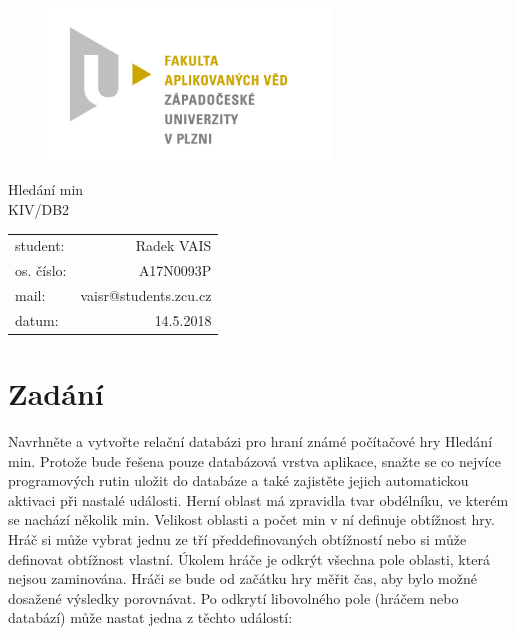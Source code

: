 \documentclass[12pt, a4paper]{article}
\begin{document}
\begin{figure}[h!]
\centering
\includegraphics[bb= 0 0 820 445 , width=75mm]{favlogo.jpg}
\end{figure}

{\centering
{\huge Hledání min}\\[1em]
{\large KIV/DB2}\\[11,5cm]
}

\begin{tabular}{l r}
student: & Radek VAIS\\
os. číslo: & A17N0093P\\
mail: & vaisr@students.zcu.cz\\
datum: & 14.5.2018\\
\end{tabular}

\thispagestyle{empty}
\newpage

\section{Zadání} %

Navrhněte a vytvořte relační databázi pro hraní známé počítačové hry Hledání min. Protože bude řešena pouze databázová vrstva aplikace, snažte se co nejvíce programových rutin uložit do databáze a také zajistěte jejich automatickou aktivaci při nastalé události.
Herní oblast má zpravidla tvar obdélníku, ve kterém se nachází několik min. Velikost oblasti a počet min v ní definuje obtížnost hry. Hráč si může vybrat jednu ze tří předdefinovaných obtížností nebo si může definovat obtížnost vlastní. Úkolem hráče je odkrýt všechna pole oblasti, která nejsou zaminována. Hráči se bude od začátku hry měřit čas, aby bylo možné dosažené výsledky porovnávat. Po odkrytí libovolného pole (hráčem nebo databází) může nastat jedna z těchto událostí:
\end{document}
